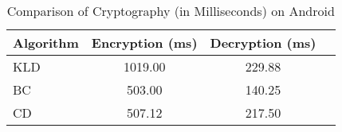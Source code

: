 \begin{table}[h!]
\centering
\begin{tabular}{|l|c|c|c|}
\hline
\textbf{Algorithm} & \textbf{Encryption (ms)} & \textbf{Decryption (ms)} \\
\hline
KLD & 1019.00 & 229.88 \\
BC  & 503.00 & 140.25 \\
CD  & 507.12 & 217.50 \\
\hline
\end{tabular}
\caption{Comparison of Cryptography (in Milliseconds) on Android}
\label{table:cryptography}
\end{table}
